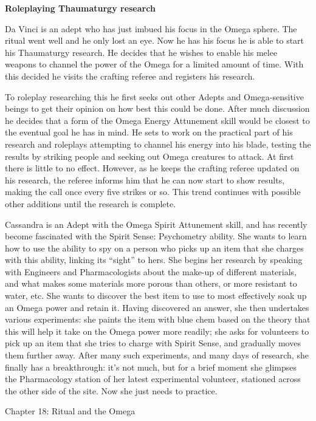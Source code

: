 \documentclass{scrbook}
\begin{document}
\textbf{Roleplaying Thaumaturgy research}

Da Vinci is an adept who has just imbued his focus in the Omega sphere. The ritual went well and he only lost an eye. Now he has his focus he is able to start his Thaumaturgy research. He decides that he wishes to enable his melee weapons to channel the power of the Omega for a limited amount of time. With this decided he visits the crafting referee and registers his research.

To roleplay researching this he first seeks out other Adepts and Omega-sensitive beings to get their opinion on how best this could be done. After much discussion he decides that a form of the Omega Energy Attunement skill would be closest to the eventual goal he has in mind. He sets to work on the practical part of his research and roleplays attempting to channel his energy into his blade, testing the results by striking people and seeking out Omega creatures to attack. At first there is little to no effect. However, as he keeps the crafting referee updated on his research, the referee informs him that he can now start to show results, making the call once every five strikes or so. This trend continues with possible other additions until the research is complete.

Cassandra is an Adept with the Omega Spirit Attunement skill, and has recently become fascinated with the Spirit Sense: Psychometry ability. She wants to learn how to use the ability to spy on a person who picks up an item that she charges with this ability, linking its ``sight'' to hers. She begins her research by speaking with Engineers and Pharmacologists about the make-up of different materials, and what makes some materials more porous than others, or more resistant to water, etc. She wants to discover the best item to use to most effectively soak up an Omega power and retain it. Having discovered an answer, she then undertakes various experiments: she paints the item with blue chem based on the theory that this will help it take on the Omega power more readily; she asks for volunteers to pick up an item that she tries to charge with Spirit Sense, and gradually moves them further away. After many such experiments, and many days of research, she finally has a breakthrough: it's not much, but for a brief moment she glimpses the Pharmacology station of her latest experimental volunteer, stationed across the other side of the site. Now she just needs to practice.

Chapter 18: Ritual and the Omega
\end{document}
